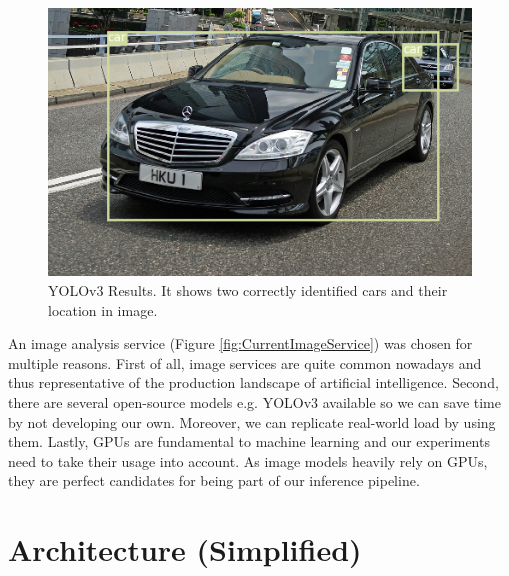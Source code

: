 \documentclass{report}
\begin{document}
\begin{figure}[h!]
  \includegraphics[width=\textwidth]{hku1.jpeg}
  \caption{YOLOv3 Results. It shows two correctly identified cars and their location in image.}
  \label{fig:YOLOResults}
\end{figure}

An image analysis service (Figure \ref{fig:CurrentImageService}) was chosen for multiple reasons.
First of all, image services are quite common nowadays and thus representative of the production landscape of artificial intelligence.
Second, there are several open-source models e.g. YOLOv3 \cite{YOLOv3} available so we can save time by not developing our own.
Moreover, we can replicate real-world load by using them.
Lastly, GPUs are fundamental to machine learning and our experiments need to take their usage into account.
As image models heavily rely on GPUs, they are perfect candidates for being part of our inference pipeline.

\section{Architecture (Simplified)}
\end{document}
